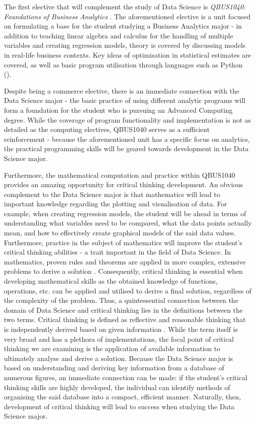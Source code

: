 The first elective that will complement the study of Data Science is \textit{QBUS1040: Foundations of Business Analytics} \cite{Usyd4}. The aforementioned elective is a unit focused on formulating a base for the student studying a Business Analytics major - in addition to teaching linear algebra and calculus for the handling of multiple variables and creating regression models, theory is covered by discussing models in real-life business contexts. Key ideas of optimisation in statistical estimates are covered, as well as basic program utilisation through languages such as Python (\cite{Usyd4}). 


Despite being a commerce elective, there is an immediate connection with the Data Science major - the basic practice of using different analytic programs will form a foundation for the student who is pursuing an Advanced Computing degree. While the coverage of program functionality and implementation is not as detailed as the computing electives, QBUS1040 serves as a sufficient reinforcement - because the aforementioned unit has a specific focus on analytics, the practical programming skills will be geared towards development in the Data Science major. 


Furthermore, the mathematical computation and practice within QBUS1040 provides an amazing opportunity for critical thinking development. An obvious complement to the Data Science major is that mathematics will lead to important knowledge regarding the plotting and visualisation of data. For example, when creating regression models, the student will be ahead in terms of understanding what variables need to be compared, what the data points actually mean, and how to effectively create graphical models of the said data values. Furthermore, practice in the subject of mathematics will improve the student’s critical thinking abilities - a trait important in the field of Data Science. In mathematics, proven rules and theorems are applied in more complex, extensive problems to derive a solution \cite{Scrip}. Consequently, critical thinking is essential when developing mathematical skills as the obtained knowledge of functions, operations, etc. can be applied and utilised to derive a final solution, regardless of the complexity of the problem. Thus, a quintessential connection between the domain of Data Science and critical thinking lies in the definitions between the two terms. Critical thinking is defined as reflective and reasonable thinking that is independently derived based on given information \cite{ennis}. While the term itself is very broad and has a plethora of implementations, the focal point of critical thinking we are examining is the application of available information to ultimately analyse and derive a solution. Because the Data Science major is based on understanding and deriving key information from a database of numerous figures, an immediate connection can be made: if the student’s critical thinking skills are highly developed, the individual can identify methods of organising the said database into a compact, efficient manner. Naturally, then, development of critical thinking will lead to success when studying the Data Science major.


